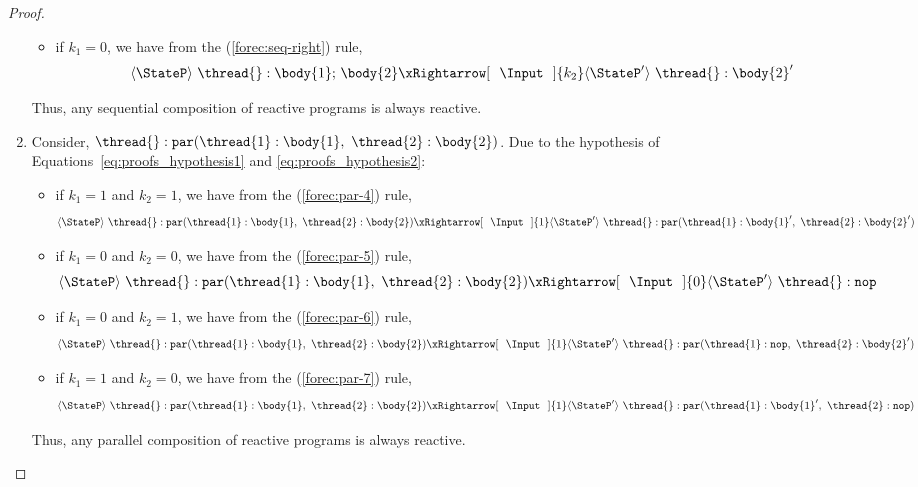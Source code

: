 \begin{proof}
\begin{enumerate}
\begin{itemize}
				\item if $k_1 = 0$, we have from the (\ref{forec:seq-right}) rule,
					  \begin{equation*}
			  		  	\langle \StateP \rangle ~ \thread{}:\body{1}\mathtt{;}~\body{2}
			  		  		\xRightarrow[~~\Input~~]{k_2} 
						\langle \StateP' \rangle ~ \thread{}:\body{2}'
			  		  \end{equation*}
			  \end{itemize}
			  Thus, any sequential composition of reactive programs is always reactive.

		\item Consider, $\thread{}:\mathtt{par}(\thread{1}:\body{1},~\thread{2}:\body{2})$.
			  Due to the hypothesis of Equations~\ref{eq:proofs_hypothesis1} and \ref{eq:proofs_hypothesis2}:
			  \begin{itemize}
			  	\item if $k_1 = 1$ and $k_2 = 1$, we have from the (\ref{forec:par-4}) rule, 
			  		  \begin{equation*}
			  		  	\langle \StateP \rangle ~ \thread{}:\mathtt{par}(\thread{1}:\body{1},~\thread{2}:\body{2})
			  		  		\xRightarrow[~~\Input~~]{1} 
						\langle \StateP' \rangle ~ \thread{}:\mathtt{par}(\thread{1}:\body{1}',~\thread{2}:\body{2}')
			  		  \end{equation*}
			  	
			  	\item if $k_1 = 0$ and $k_2 = 0$, we have from the (\ref{forec:par-5}) rule, 
			  		  \begin{equation*}
			  		  	\langle \StateP \rangle ~ \thread{}:\mathtt{par}(\thread{1}:\body{1},~\thread{2}:\body{2})
			  		  		\xRightarrow[~~\Input~~]{0} 
						\langle \StateP' \rangle ~ \thread{}:\mathtt{nop}
			  		  \end{equation*}

			  	\item if $k_1 = 0$ and $k_2 = 1$, we have from the (\ref{forec:par-6}) rule, 
			  		  \begin{equation*}
			  		  	\langle \StateP \rangle ~ \thread{}:\mathtt{par}(\thread{1}:\body{1},~\thread{2}:\body{2})
			  		  		\xRightarrow[~~\Input~~]{1} 
						\langle \StateP' \rangle ~ \thread{}:\mathtt{par}(\thread{1}:\mathtt{nop},~\thread{2}:\body{2}')
			  		  \end{equation*}

			  	\item if $k_1 = 1$ and $k_2 = 0$, we have from the (\ref{forec:par-7}) rule, 
			  		  \begin{equation*}
			  		  	\langle \StateP \rangle ~ \thread{}:\mathtt{par}(\thread{1}:\body{1},~\thread{2}:\body{2})
			  		  		\xRightarrow[~~\Input~~]{1} 
						\langle \StateP' \rangle ~ \thread{}:\mathtt{par}(\thread{1}:\body{1}',~\thread{2}:\mathtt{nop})
			  		  \end{equation*}
			  \end{itemize}
			  Thus, any parallel composition of reactive programs is always reactive.
	\end{enumerate}
\end{proof}

